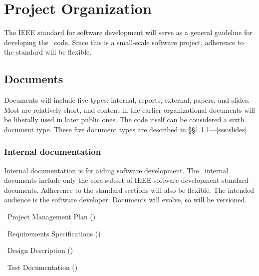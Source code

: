 \documentclass[11pt]{article}
\begin{document}
\section{Project Organization}

The IEEE standard for software development will serve as a general
guideline for developing the \amrSolve\ code.  Since this is a 
small-scale software project, adherence to the standard will be
flexible.

\subsection{Documents}

Documents will include five types: internal, reports, external,
papers, and slides. Most are relatively short, and content in the
earlier organizational documents will be liberally used in later
public ones.  The code itself can be considered a sixth document type.
These five document types are described in
\S\S\ref{sss:internal}---\ref{sss:slides}


\subsubsection{Internal documentation} \label{sss:internal}

Internal documentation is for aiding software development.  The
\amrSolve\ internal documents include only the core subset of IEEE
software development standard documents.  Adherence to the standard
sections will also be flexible.  The intended audience is the software
developer.  Documents will evolve, so will be versioned.

\BeginENUMERATE
  \item  \amrSolve\ Project Management Plan ()
  \item  \amrSolve\ Requirements Specifications ()
  \item  \amrSolve\ Design Description ()
  \item  \amrSolve\ Test Documentation ()
\EndENUMERATE
\end{document}
